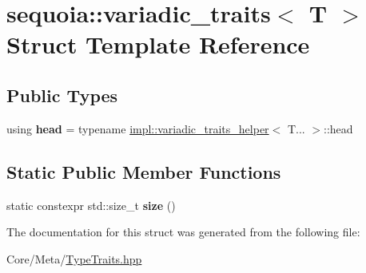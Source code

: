 \hypertarget{structsequoia_1_1variadic__traits}{}\section{sequoia\+::variadic\+\_\+traits$<$ T $>$ Struct Template Reference}
\label{structsequoia_1_1variadic__traits}
\subsection*{Public Types}
\begin{DoxyCompactItemize}
\item 
\mbox{\label{structsequoia_1_1variadic__traits_a7340d178ef5396dbec26ee5ee10bc70b}} 
using {\bfseries head} = typename \mbox{\hyperlink{structsequoia_1_1impl_1_1variadic__traits__helper}{impl\+::variadic\+\_\+traits\+\_\+helper}}$<$ T... $>$\+::head
\end{DoxyCompactItemize}
\subsection*{Static Public Member Functions}
\begin{DoxyCompactItemize}
\item 
\mbox{\label{structsequoia_1_1variadic__traits_a577a7707ebb3bd93f685e63efc37d60b}} 
static constexpr std\+::size\+\_\+t {\bfseries size} ()
\end{DoxyCompactItemize}


The documentation for this struct was generated from the following file\+:\begin{DoxyCompactItemize}
\item 
Core/\+Meta/\mbox{\hyperlink{_type_traits_8hpp}{Type\+Traits.\+hpp}}\end{DoxyCompactItemize}
